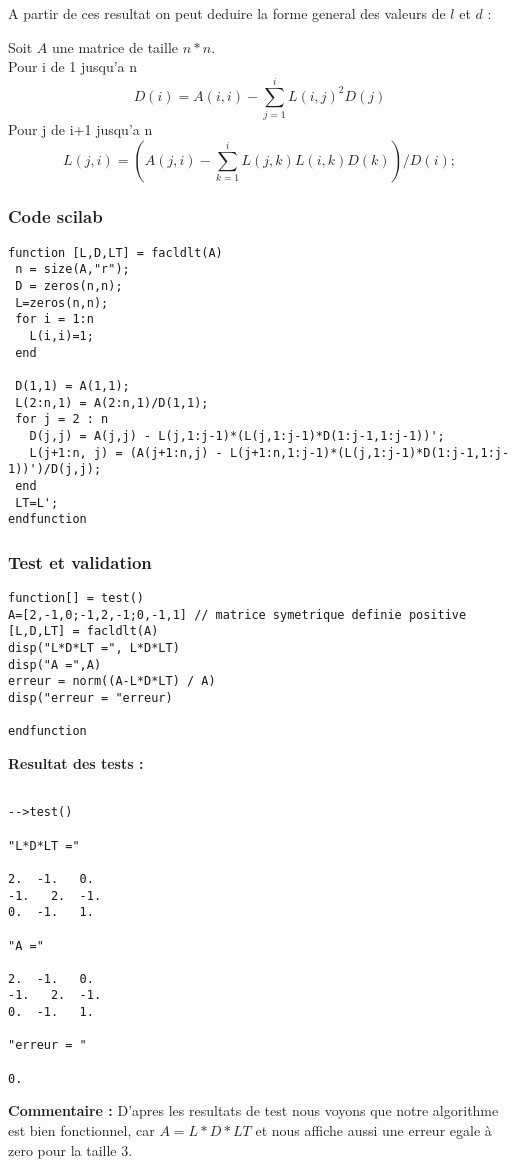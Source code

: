 \documentclass[12pt]{report}
\begin{document}
A partir de ces resultat on peut deduire la forme general des valeurs de $l$ et $d$ :

Soit $A$ une matrice de taille $n*n$.\\[0.5cm]
Pour i de 1 jusqu'a n 
$$
D(i)=A(i, i)-\sum_{j=1}^{i} L(i, j)^{2} D(j)
$$
Pour j de i+1 jusqu'a n
$$
L(j, i)=\left(A(j, i)-\sum_{k=1}^{i} L(j, k) L(i, k) D(k)\right) / D(i) ;
$$


\subsubsection{Code scilab}
\begin{lstlisting}
function [L,D,LT] = facldlt(A) 
 n = size(A,"r");
 D = zeros(n,n);
 L=zeros(n,n);
 for i = 1:n
   L(i,i)=1;
 end

 D(1,1) = A(1,1);
 L(2:n,1) = A(2:n,1)/D(1,1);
 for j = 2 : n
   D(j,j) = A(j,j) - L(j,1:j-1)*(L(j,1:j-1)*D(1:j-1,1:j-1))';
   L(j+1:n, j) = (A(j+1:n,j) - L(j+1:n,1:j-1)*(L(j,1:j-1)*D(1:j-1,1:j-1))')/D(j,j);
 end
 LT=L';
endfunction
\end{lstlisting}

\subsubsection{Test et validation}
\begin{lstlisting}
function[] = test()
A=[2,-1,0;-1,2,-1;0,-1,1] // matrice symetrique definie positive
[L,D,LT] = facldlt(A)
disp("L*D*LT =", L*D*LT)
disp("A =",A)
erreur = norm((A-L*D*LT) / A) 
disp("erreur = "erreur)

endfunction
\end{lstlisting}

\textbf{Resultat des tests :}

\begin{lstlisting}

-->test()

"L*D*LT ="

2.  -1.   0.
-1.   2.  -1.
0.  -1.   1.

"A ="

2.  -1.   0.
-1.   2.  -1.
0.  -1.   1.

"erreur = "

0.
\end{lstlisting}

\textbf{Commentaire :} D'apres les resultats de test nous voyons que notre algorithme est bien fonctionnel, car $A=L*D*LT$ et nous affiche aussi une erreur egale à zero pour la taille 3.\\
\end{document}
